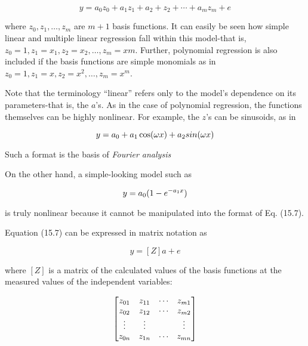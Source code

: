 \documentclass[../main.tex]{subfiles}
\begin{document}
\begin{equation}
	\tag{15.7}
	y = a_0 z_0 + a_1 z_1 + a_2 + z_2 + \cdots + a_m z_m + e
\end{equation}

\noindent where $z_0, z_1, \ldots, z_m$ are $m + 1$ basis functions. It can easily be seen how simple linear and multiple linear regression fall within this model-that is, $z_0 = 1, z_1 = x_1, z_2 = x_2, \ldots, z_m = xm$. Further, polynomial regression is also included if the basis functions are simple monomials as in $z_0 = 1, z_1 = x, z_2 = x^2, \ldots, z_m = x^m$.

Note that the terminology ``linear'' refers only to the model's dependence on its
parameters-that is, the $a$'s. As in the case of polynomial regression, the functions themselves can be highly nonlinear. For example, the $z$'s can be sinusoids, as in

\begin{equation}
	\notag
	y = a_0 + a_1 \cos (\omega x) + a_2 sin (\omega x)
\end{equation}

\noindent Such a format is the basis of \textit{Fourier analysis}

On the other hand, a simple-looking model such as

\begin{equation}
	\notag
	y = a_0 (1- e^{-a_1 x})
\end{equation}

\noindent is truly nonlinear because it cannot be manipulated into the format of Eq. (15.7).

Equation (15.7) can be expressed in matrix notation as

\begin{equation}
	\tag{15.8}
	{y} = [Z] {a} + {e}
\end{equation}

\noindent where $[Z]$ is a matrix of the calculated values of the basis functions at the measured values of the independent variables:

\begin{equation}
	\notag
	\begin{bmatrix}
		z_{01} & z_{11} & \cdots & z_{m1} \\ 
		z_{02} & z_{12} & \cdots & z_{m2} \\ 
		\vdots & \vdots &        & \vdots \\ 
		z_{0n} & z_{1n} & \cdots & z_{mn}
	\end{bmatrix}
\end{equation}
\end{document}
